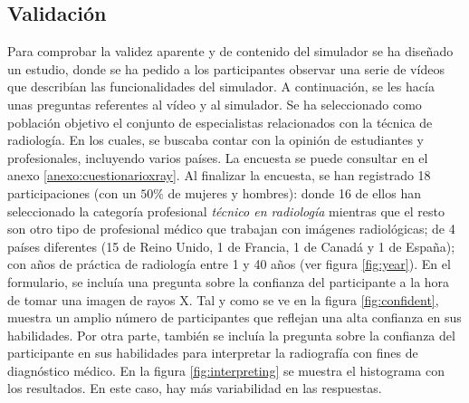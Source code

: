 \subsection{Validación}
\label{xray:validacion}
Para comprobar la validez aparente y de contenido del simulador se ha diseñado un estudio, donde se ha pedido a los participantes observar una serie de vídeos que describían las funcionalidades del simulador. A continuación, se les hacía unas preguntas referentes al vídeo y al simulador. Se ha seleccionado como población objetivo el conjunto de especialistas relacionados con la técnica de radiología. En los cuales, se buscaba contar con la opinión de estudiantes y profesionales, incluyendo varios países. La encuesta se puede consultar en el anexo \ref{anexo:cuestionarioxray}.
%
Al finalizar la encuesta, se han registrado 18 participaciones (con un $50\%$ de mujeres y hombres): donde 16 de ellos han seleccionado la categoría profesional \emph{técnico en radiología} mientras que el resto son otro tipo de profesional médico que trabajan con imágenes radiológicas; de 4 países diferentes (15 de Reino Unido, 1 de Francia, 1 de Canadá y 1 de España); con años de práctica de radiología entre 1 y 40 años (ver figura \ref{fig:year}).
%
En el formulario, se incluía una pregunta sobre la confianza del participante a la hora de tomar una imagen de rayos X. Tal y como se ve en la figura \ref{fig:confident}, muestra un amplio número de participantes que reflejan una alta confianza en sus habilidades.
%
Por otra parte, también se incluía la pregunta sobre la confianza del participante en sus habilidades para interpretar la radiografía con fines de diagnóstico médico. En la figura \ref{fig:interpreting} se muestra el histograma con los resultados. En este caso, hay más variabilidad en las respuestas.


